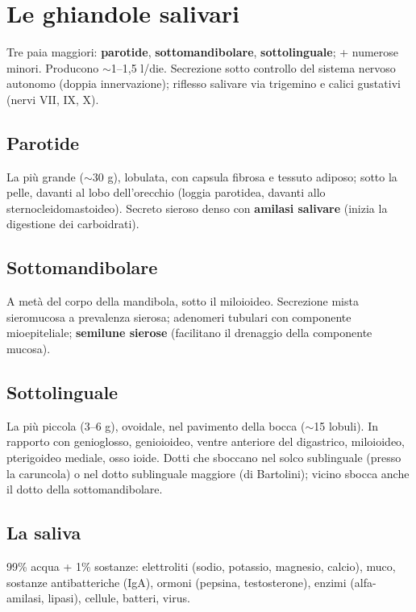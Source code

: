 \section{Le ghiandole salivari}

Tre paia maggiori: \textbf{parotide}, \textbf{sottomandibolare}, \textbf{sottolinguale}; + numerose
minori. Producono $\sim$1--1,5 l/die. Secrezione sotto controllo del sistema nervoso autonomo (doppia
innervazione); riflesso salivare via trigemino e calici gustativi (nervi VII, IX, X).

\subsection{Parotide}
La più grande ($\sim$30 g), lobulata, con capsula fibrosa e tessuto adiposo; sotto la pelle, davanti
al lobo dell'orecchio (loggia parotidea, davanti allo sternocleidomastoideo). Secreto sieroso denso
con \textbf{amilasi salivare} (inizia la digestione dei carboidrati).

\subsection{Sottomandibolare}
A metà del corpo della mandibola, sotto il miloioideo. Secrezione mista sieromucosa a prevalenza
sierosa; adenomeri tubulari con componente mioepiteliale; \textbf{semilune sierose} (facilitano il
drenaggio della componente mucosa).

\subsection{Sottolinguale}
La più piccola (3--6 g), ovoidale, nel pavimento della bocca ($\sim$15 lobuli). In rapporto con
genioglosso, genioioideo, ventre anteriore del digastrico, miloioideo, pterigoideo mediale, osso
ioide. Dotti che sboccano nel solco sublinguale (presso la caruncola) o nel dotto sublinguale maggiore
(di Bartolini); vicino sbocca anche il dotto della sottomandibolare.

\subsection{La saliva}
99\% acqua + 1\% sostanze: elettroliti (sodio, potassio, magnesio, calcio), muco, sostanze
antibatteriche (IgA), ormoni (pepsina, testosterone), enzimi (alfa-amilasi, lipasi), cellule, batteri,
virus.

